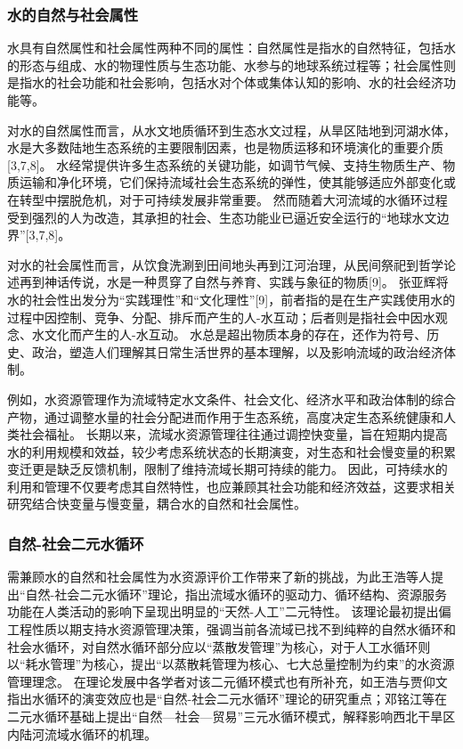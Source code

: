 

\subsubsection*{水的自然与社会属性}

水具有自然属性和社会属性两种不同的属性：自然属性是指水的自然特征，包括水的形态与组成、水的物理性质与生态功能、水参与的地球系统过程等；社会属性则是指水的社会功能和社会影响，包括水对个体或集体认知的影响、水的社会经济功能等。

对水的自然属性而言，从水文地质循环到生态水文过程，从旱区陆地到河湖水体，水是大多数陆地生态系统的主要限制因素，也是物质运移和环境演化的重要介质[3,7,8]。
水经常提供许多生态系统的关键功能，如调节气候、支持生物质生产、物质运输和净化环境，它们保持流域社会生态系统的弹性，使其能够适应外部变化或在转型中摆脱危机，对于可持续发展非常重要。
然而随着大河流域的水循环过程受到强烈的人为改造，其承担的社会、生态功能业已逼近安全运行的“地球水文边界”[3,7,8]。

对水的社会属性而言，从饮食洗涮到田间地头再到江河治理，从民间祭祀到哲学论述再到神话传说，水是一种贯穿了自然与养育、实践与象征的物质[9]。
张亚辉将水的社会性出发分为“实践理性”和“文化理性”[9]，前者指的是在生产实践使用水的过程中因控制、竞争、分配、排斥而产生的人-水互动；后者则是指社会中因水观念、水文化而产生的人-水互动。
水总是超出物质本身的存在，还作为符号、历史、政治，塑造人们理解其日常生活世界的基本理解，以及影响流域的政治经济体制\cite{ballestero2019}。

例如，水资源管理作为流域特定水文条件、社会文化、经济水平和政治体制的综合产物，通过调整水量的社会分配进而作用于生态系统，高度决定生态系统健康和人类社会福祉。
长期以来，流域水资源管理往往通过调控快变量，旨在短期内提高水的利用规模和效益，较少考虑系统状态的长期演变，对生态和社会慢变量的积累变迁更是缺乏反馈机制，限制了维持流域长期可持续的能力。
因此，可持续水的利用和管理不仅要考虑其自然特性，也应兼顾其社会功能和经济效益，这要求相关研究结合快变量与慢变量，耦合水的自然和社会属性。

\subsubsection*{自然-社会二元水循环}

需兼顾水的自然和社会属性为水资源评价工作带来了新的挑战，为此王浩等人提出“自然-社会二元水循环”理论，指出流域水循环的驱动力、循环结构、资源服务功能在人类活动的影响下呈现出明显的“天然-人工”二元特性\cite{wang2006}。
该理论最初提出偏工程性质以期支持水资源管理决策，强调当前各流域已找不到纯粹的自然水循环和社会水循环，对自然水循环部分应以“蒸散发管理”为核心，对于人工水循环则以“耗水管理”为核心，提出“以蒸散耗管理为核心、七大总量控制为约束”的水资源管理理念\cite{wang2010}。
在理论发展中各学者对该二元循环模式也有所补充，如王浩与贾仰文指出水循环的演变效应也是“自然-社会二元水循环”理论的研究重点\cite{wang2016}；邓铭江等在二元水循环基础上提出“自然—社会—贸易”三元水循环模式，解释影响西北干旱区内陆河流域水循环的机理\cite{deng2020}。

